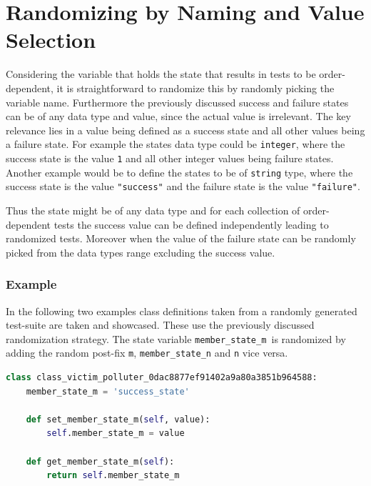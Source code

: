 \documentclass[
fancyheadings, %
%
%
]{stsreprt}
\begin{document}
\section{Randomizing by Naming and Value Selection}
Considering the variable that holds the state that results in tests to be order-dependent, it is straightforward to randomize this by randomly picking the variable name. 
Furthermore the previously discussed success and failure states can be of any data type and value, since the actual value is irrelevant. 
The key relevance lies in a value being defined as a success state and all other values being a failure state.
For example the states data type could be \texttt{integer}, where the success state is the value \texttt{1} and all other integer values being failure states. 
Another example would be to define the states to be of \texttt{string} type, where the success state is the value \texttt{"success"} and the failure state is the value \texttt{"failure"}. \par
Thus the state might be of any data type and for each collection of order-dependent tests the success value can be defined independently leading to randomized tests. 
Moreover when the value of the failure state can be randomly picked from the data types range excluding the success value. 
\subsubsection{Example}
In the following two examples class definitions taken from a randomly generated test-suite are taken and showcased. 
These use the previously discussed randomization strategy. 
The state variable \texttt{member\_state\_m }is randomized by adding the random post-fix \texttt{m}, \texttt{member\_state\_n} and \texttt{n} vice versa. 
\begin{lstlisting}[language=Python, caption={Class definition used in a flaky test from the victim- and polluter-pattern}, label=lst:class_vic_pol]
class class_victim_polluter_0dac8877ef91402a9a80a3851b964588:
    member_state_m = 'success_state'

    def set_member_state_m(self, value):
        self.member_state_m = value

    def get_member_state_m(self):
        return self.member_state_m
\end{lstlisting}
\end{document}
